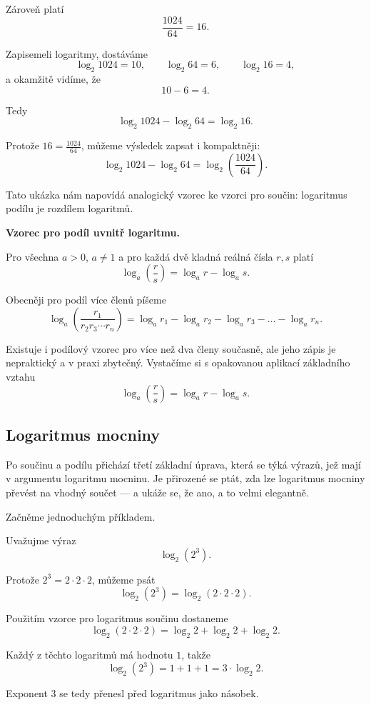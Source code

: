 \documentclass[12pt,a4paper]{article}
\begin{document}
Zároveň platí
\[
\frac{1024}{64} = 16.
\]

Zapisemeli logaritmy, dostáváme
\[
\log_2 1024 = 10,\qquad \log_2 64 = 6,\qquad \log_2 16 = 4,
\]
a okamžitě vidíme, že
\[
10 - 6 = 4.
\]

Tedy
\[
\log_2 1024 - \log_2 64 = \log_2 16.
\]

Protože $16 = \frac{1024}{64}$, můžeme výsledek zapsat i kompaktněji:
\[
\log_2 1024 - \log_2 64 = \log_2 \left( \frac{1024}{64} \right).
\]

Tato ukázka nám napovídá analogický vzorec ke vzorci pro součin: logaritmus podílu
je rozdílem logaritmů.


\begin{definitionbox}
\textbf{Vzorec pro podíl uvnitř logaritmu.}

Pro všechna $a>0$, $a\neq 1$ a pro každá dvě kladná reálná čísla $r, s$ platí
\[
\log_a\left(\frac{r}{s}\right)
=
\log_a r - \log_a s.
\]

Obecněji pro podíl více členů píšeme
\[
\log_a\!\left(\frac{r_1}{r_2 r_3 \cdots r_n}\right)
=
\log_a r_1 - \log_a r_2 - \log_a r_3 - \dots - \log_a r_n.
\]
\end{definitionbox}


\begin{notebox}
Existuje i podílový vzorec pro více než dva členy současně, ale jeho zápis je
nepraktický a v praxi zbytečný. Vystačíme si s opakovanou aplikací základního vztahu
\[
\log_a\left(\frac{r}{s}\right) = \log_a r - \log_a s.
\]
\end{notebox}



\subsection*{Logaritmus mocniny}

Po součinu a podílu přichází třetí základní úprava, která se týká výrazů, jež mají
v argumentu logaritmu mocninu. Je přirozené se ptát, zda lze logaritmus mocniny
převést na vhodný součet — a ukáže se, že ano, a to velmi elegantně.

Začněme jednoduchým příkladem.

\begin{examplebox}
Uvažujme výraz
\[
\log_2(2^3).
\]

Protože $2^3 = 2 \cdot 2 \cdot 2$, můžeme psát
\[
\log_2(2^3)
=
\log_2(2\cdot 2 \cdot 2).
\]

Použitím vzorce pro logaritmus součinu dostaneme
\[
\log_2(2\cdot 2 \cdot 2)
=
\log_2 2 + \log_2 2 + \log_2 2.
\]

Každý z těchto logaritmů má hodnotu $1$, takže
\[
\log_2(2^3) = 1 + 1 + 1 = 3 \cdot \log_2 2.
\]

Exponent $3$ se tedy přenesl před logaritmus jako násobek.
\end{examplebox}
\end{document}
